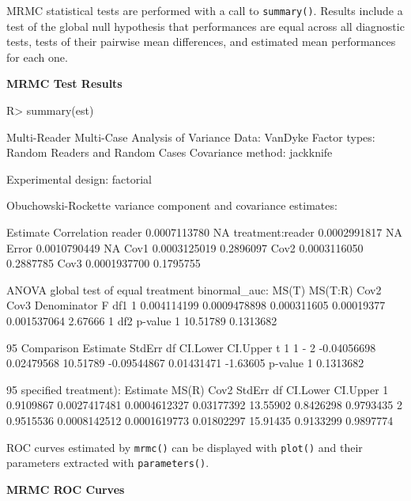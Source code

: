 \documentclass[
]{jss}
\begin{document}
MRMC statistical tests are performed with a call to \texttt{summary()}.
Results include a test of the global null hypothesis that performances
are equal across all diagnostic tests, tests of their pairwise mean
differences, and estimated mean performances for each one.

\textbf{MRMC Test Results}

\begin{CodeChunk}
\begin{CodeInput}
R> summary(est)
\end{CodeInput}
\begin{CodeOutput}
Multi-Reader Multi-Case Analysis of Variance
Data: VanDyke
Factor types: Random Readers and Random Cases
Covariance method: jackknife

Experimental design: factorial 

Obuchowski-Rockette variance component and covariance estimates:

                     Estimate Correlation
reader           0.0007113780          NA
treatment:reader 0.0002991817          NA
Error            0.0010790449          NA
Cov1             0.0003125019   0.2896097
Cov2             0.0003116050   0.2887785
Cov3             0.0001937700   0.1795755


ANOVA global test of equal treatment binormal_auc:
        MS(T)      MS(T:R)        Cov2       Cov3 Denominator       F df1
1 0.004114199 0.0009478898 0.000311605 0.00019377 0.001537064 2.67666   1
       df2   p-value
1 10.51789 0.1313682


95%
  Comparison    Estimate     StdErr       df    CI.Lower    CI.Upper        t
1      1 - 2 -0.04056698 0.02479568 10.51789 -0.09544867  0.01431471 -1.63605
    p-value
1 0.1313682


95%
specified treatment):
   Estimate        MS(R)         Cov2     StdErr       df  CI.Lower  CI.Upper
1 0.9109867 0.0027417481 0.0004612327 0.03177392 13.55902 0.8426298 0.9793435
2 0.9515536 0.0008142512 0.0001619773 0.01802297 15.91435 0.9133299 0.9897774
\end{CodeOutput}
\end{CodeChunk}

ROC curves estimated by \texttt{mrmc()} can be displayed with
\texttt{plot()} and their parameters extracted with
\texttt{parameters()}.

\textbf{MRMC ROC Curves}
\end{document}

